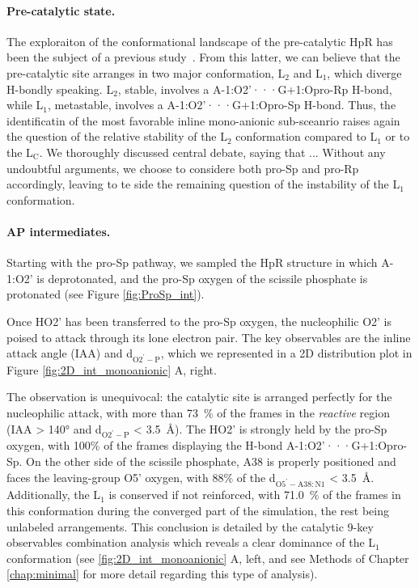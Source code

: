 \documentclass[journal=jacsat,manuscript=article]{achemso}
\begin{document}
\paragraph{Pre-catalytic state.}
The exploraiton of the conformational landscape of the pre-catalytic HpR has been the subject of a previous study~\cite{forget2024simulation}.
From this latter, we can believe that the pre-catalytic site arranges in two major conformation, L$_\mathrm{2}$ and L$_\mathrm{1}$,
which diverge H-bondly speaking. 
L$_\mathrm{2}$, stable, involves a A-1:O2'···G+1:Opro-Rp H-bond, 
while L$_\mathrm{1}$, metastable, involves a A-1:O2'···G+1:Opro-Sp H-bond.  
Thus, the identificatin of the most favorable inline mono-anionic sub-sceanrio 
raises again the question of the relative stability of the L$_\mathrm{2}$ conformation compared to L$_\mathrm{1}$ 
or to the L$_\mathrm{C}$.
We thoroughly discussed central debate, saying that ... 
Without any undoubtful arguments,
we choose to considere both pro-Sp and pro-Rp accordingly, leaving to te side the remaining question of the instability of the L$_\mathrm{1}$ conformation.


\paragraph{AP intermediates. }

Starting with the pro-Sp pathway, we sampled the HpR structure in which A-1:O2' is deprotonated, 
and the pro-Sp oxygen of the scissile phosphate is protonated (see Figure \ref{fig:ProSp_int}).

Once HO2' has been transferred to the pro-Sp oxygen, the nucleophilic O2' is poised to attack through its lone electron pair.
The key observables are the inline attack angle (IAA) and d$_\mathrm{O2^{\prime}-P}$, 
which we represented in a 2D distribution plot in Figure \ref{fig:2D_int_monoanionic} A, right.

The observation is unequivocal: the catalytic site is arranged perfectly for the nucleophilic attack, 
with more than 73~\% of the frames in the \textit{reactive} region (IAA > 140° and d$_\mathrm{O2^{\prime}-P}$ < 3.5~\AA).
The HO2' is strongly held by the pro-Sp oxygen, with 100\% of the frames displaying the H-bond A-1:O2'···G+1:Opro-Sp.
On the other side of the scissile phosphate, A38 is properly positioned 
and faces the leaving-group O5' oxygen, with 88$\%$ of the d$_\mathrm{O5^{\prime}-A38:N1}$ < 3.5~\AA.
Additionally, the L$_\mathrm{1}$ is conserved if not reinforced, with 71.0~\% 
of the frames in this conformation during the converged part of the simulation, the rest being unlabeled arrangements.
This conclusion is detailed by the catalytic 9-key observables combination analysis 
which reveals a clear dominance of the L$_\mathrm{1}$ conformation (see \ref{fig:2D_int_monoanionic} A, left, 
and see Methods of Chapter \ref{chap:minimal} for more detail regarding this type of analysis).
\end{document}

